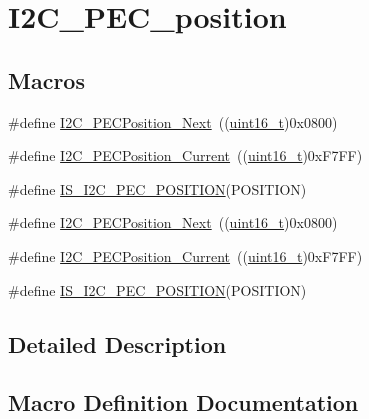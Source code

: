 \hypertarget{group___i2_c___p_e_c__position}{}\section{I2\+C\+\_\+\+P\+E\+C\+\_\+position}
\label{group___i2_c___p_e_c__position}
\subsection*{Macros}
\begin{DoxyCompactItemize}
\item 
\#define \hyperlink{group___i2_c___p_e_c__position_ga74d0996efe6e278fb28d053ba78fccc5}{I2\+C\+\_\+\+P\+E\+C\+Position\+\_\+\+Next}~((\hyperlink{_p_e___types_8h_a1f1825b69244eb3ad2c7165ddc99c956}{uint16\+\_\+t})0x0800)
\item 
\#define \hyperlink{group___i2_c___p_e_c__position_ga8a393364dd651f88bcaebac71c1c52c7}{I2\+C\+\_\+\+P\+E\+C\+Position\+\_\+\+Current}~((\hyperlink{_p_e___types_8h_a1f1825b69244eb3ad2c7165ddc99c956}{uint16\+\_\+t})0x\+F7\+F\+F)
\item 
\#define \hyperlink{group___i2_c___p_e_c__position_gac8611a62b06256b1b3c60d4859a016ef}{I\+S\+\_\+\+I2\+C\+\_\+\+P\+E\+C\+\_\+\+P\+O\+S\+I\+T\+I\+ON}(P\+O\+S\+I\+T\+I\+ON)
\item 
\#define \hyperlink{group___i2_c___p_e_c__position_ga74d0996efe6e278fb28d053ba78fccc5}{I2\+C\+\_\+\+P\+E\+C\+Position\+\_\+\+Next}~((\hyperlink{_p_e___types_8h_a1f1825b69244eb3ad2c7165ddc99c956}{uint16\+\_\+t})0x0800)
\item 
\#define \hyperlink{group___i2_c___p_e_c__position_ga8a393364dd651f88bcaebac71c1c52c7}{I2\+C\+\_\+\+P\+E\+C\+Position\+\_\+\+Current}~((\hyperlink{_p_e___types_8h_a1f1825b69244eb3ad2c7165ddc99c956}{uint16\+\_\+t})0x\+F7\+F\+F)
\item 
\#define \hyperlink{group___i2_c___p_e_c__position_gac8611a62b06256b1b3c60d4859a016ef}{I\+S\+\_\+\+I2\+C\+\_\+\+P\+E\+C\+\_\+\+P\+O\+S\+I\+T\+I\+ON}(P\+O\+S\+I\+T\+I\+ON)
\end{DoxyCompactItemize}


\subsection{Detailed Description}


\subsection{Macro Definition Documentation}
